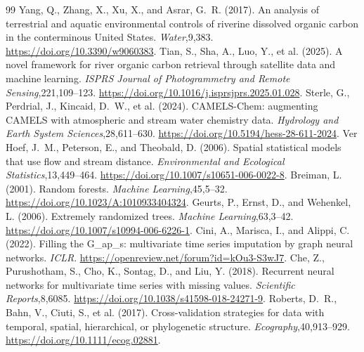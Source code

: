 \documentclass[11pt]{article}
\begin{document}
\begin{thebibliography}{99}
Yang, Q., Zhang, X., Xu, X., and Asrar, G.~R. (2017). An analysis of terrestrial and aquatic environmental controls of riverine dissolved organic carbon in the conterminous United States. \emph{Water},9,383. \url{https://doi.org/10.3390/w9060383}.
Tian, S., Sha, A., Luo, Y., et al. (2025). A novel framework for river organic carbon retrieval through satellite data and machine learning. \emph{ISPRS Journal of Photogrammetry and Remote Sensing},221,109--123. \url{https://doi.org/10.1016/j.isprsjprs.2025.01.028}.
Sterle, G., Perdrial, J., Kincaid, D.~W., et al. (2024). CAMELS-Chem: augmenting CAMELS with atmospheric and stream water chemistry data. \emph{Hydrology and Earth System Sciences},28,611--630. \url{https://doi.org/10.5194/hess-28-611-2024}.
Ver Hoef, J.~M., Peterson, E., and Theobald, D. (2006). Spatial statistical models that use flow and stream distance. \emph{Environmental and Ecological Statistics},13,449--464. \url{https://doi.org/10.1007/s10651-006-0022-8}.
Breiman, L. (2001). Random forests. \emph{Machine Learning},45,5--32. \url{https://doi.org/10.1023/A:1010933404324}.
Geurts, P., Ernst, D., and Wehenkel, L. (2006). Extremely randomized trees. \emph{Machine Learning},63,3--42. \url{https://doi.org/10.1007/s10994-006-6226-1}.
Cini, A., Marisca, I., and Alippi, C. (2022). Filling the G\_ap\_s: multivariate time series imputation by graph neural networks. \emph{ICLR}. \url{https://openreview.net/forum?id=kOu3-S3wJ7}.
Che, Z., Purushotham, S., Cho, K., Sontag, D., and Liu, Y. (2018). Recurrent neural networks for multivariate time series with missing values. \emph{Scientific Reports},8,6085. \url{https://doi.org/10.1038/s41598-018-24271-9}.
Roberts, D.~R., Bahn, V., Ciuti, S., et al. (2017). Cross-validation strategies for data with temporal, spatial, hierarchical, or phylogenetic structure. \emph{Ecography},40,913--929. \url{https://doi.org/10.1111/ecog.02881}.
\end{thebibliography}
\end{document}
